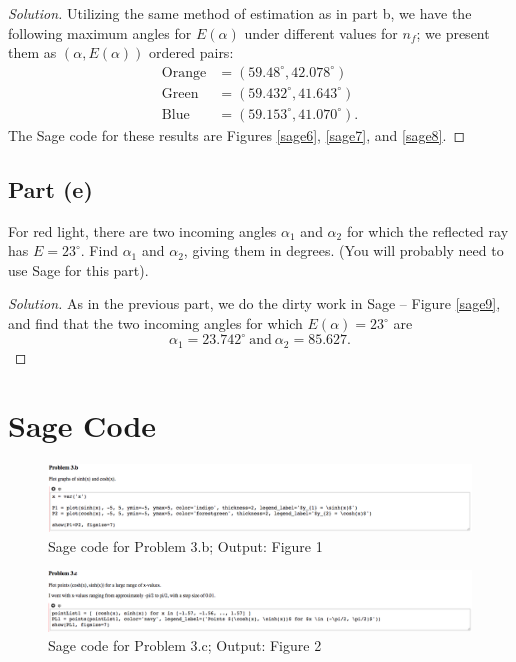 \documentclass[letterpaper, 12pt]{amsart}
\theoremstyle{definition}  %
\begin{document}
		\begin{proof}[Solution]
		Utilizing the same method of estimation as in part b, we have the following maximum angles for $E(\alpha)$ under different values for $n_{f}$; we present them as $(\alpha, E(\alpha))$ ordered pairs:
			\begin{align*}
				\text{Orange} &= (59.48^{\circ}, 42.078^{\circ}) \\
				\text{Green} &= (59.432^{\circ}, 41.643^{\circ}) \\
				\text{Blue} &= (59.153^{\circ}, 41.070^{\circ}).
			\end{align*}
		The Sage code for these results are Figures \ref{sage6}, \ref{sage7}, and \ref{sage8}.
		\end{proof}

		\subsection*{Part (e)}
		For red light, there are two incoming angles $\alpha_{1}$ and $\alpha_{2}$ for which the reflected ray has $E = 23^{\circ}$. 
		Find $\alpha_{1}$ and $\alpha_{2}$, giving them in degrees. 
		(You will probably need to use Sage for this part).

		\begin{proof}[Solution]
		As in the previous part, we do the dirty work in Sage -- Figure \ref{sage9}, and find that the two incoming angles for which $E(\alpha) = 23^{\circ}$ are $$\alpha_{1} = 23.742^{\circ} \ \text{and} \ \alpha_{2} = 85.627.$$
		\end{proof}
	\pagebreak

	\section*{Sage Code}
		\begin{figure}[h]
			\includegraphics[width=\textwidth]{sage/images/1.png}
			\caption{Sage code for Problem 3.b; Output: Figure 1}
			\label{sage1}
		\end{figure}

		\begin{figure}[h]
			\includegraphics[width=\textwidth]{sage/images/2.png}
			\caption{Sage code for Problem 3.c; Output: Figure 2}
			\label{sage2}
		\end{figure}
\end{document}
